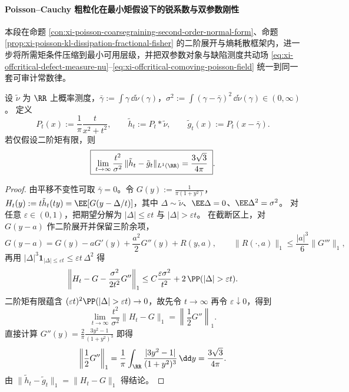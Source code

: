 \paragraph{Poisson--Cauchy 粗粒化在最小矩假设下的锐系数与双参数刚性}
本段在命题 \ref{con:xi-poisson-coarsegraining-second-order-normal-form}、命题 \ref{prop:xi-poisson-kl-dissipation-fractional-fisher} 的二阶展开与熵耗散框架内，进一步将所需矩条件压缩到最小可用层级，并把双参数对象与缺陷测度共动场
\eqref{eq:xi-offcritical-defect-measure-nu}--\eqref{eq:xi-offcritical-comoving-poisson-field}
统一到同一套可审计常数律。


\begin{theorem}\label{thm:xi-poisson-tv-sharp-constant-second-moment-only}
设 \(\tilde\nu\) 为 \(\RR\) 上概率测度，\(\bar\gamma:=\int \gamma\,\dd\tilde\nu(\gamma)\)，\(\sigma^2:=\int(\gamma-\bar\gamma)^2\,\dd\tilde\nu(\gamma)\in(0,\infty)\)。
定义
\[
P_t(x):=\frac{1}{\pi}\frac{t}{x^2+t^2},\qquad
\tilde h_t:=P_t*\tilde\nu,\qquad
\tilde g_t(x):=P_t(x-\bar\gamma).
\]
若仅假设二阶矩有限，则
\begin{equation}\label{eq:xi-poisson-tv-sharp-second-moment-only}
\boxed{\;
\lim_{t\to\infty}\frac{t^2}{\sigma^2}\,\|\tilde h_t-\tilde g_t\|_{L^1(\RR)}
=\frac{3\sqrt3}{4\pi}\; }.
\end{equation}
\end{theorem}

\begin{proof}
由平移不变性可取 \(\bar\gamma=0\)。令 \(G(y):=\frac{1}{\pi(1+y^2)}\)，\(H_t(y):=t\tilde h_t(ty)=\EE[G(y-\Delta/t)]\)，其中 \(\Delta\sim\tilde\nu\)、\(\EE\Delta=0\)、\(\EE\Delta^2=\sigma^2\)。
对任意 \(\varepsilon\in(0,1)\)，把期望分解为 \(|\Delta|\le \varepsilon t\) 与 \(|\Delta|>\varepsilon t\)。
在截断区上，对 \(G(y-a)\) 作二阶展开并保留三阶余项，
\[
G(y-a)=G(y)-aG'(y)+\frac{a^2}{2}G''(y)+R(y,a),\qquad
\|R(\cdot,a)\|_1\le \frac{|a|^3}{6}\|G'''\|_1,
\]
再用 \(|\Delta|^3\mathbf 1_{|\Delta|\le \varepsilon t}\le \varepsilon t\,\Delta^2\) 得
\[
\left\|H_t-G-\frac{\sigma^2}{2t^2}G''\right\|_1
\le C\frac{\varepsilon\sigma^2}{t^2}
+2\,\PP(|\Delta|>\varepsilon t).
\]
二阶矩有限蕴含 \((\varepsilon t)^2\PP(|\Delta|>\varepsilon t)\to0\)，故先令 \(t\to\infty\) 再令 \(\varepsilon\downarrow0\)，得到
\[
\lim_{t\to\infty}\frac{t^2}{\sigma^2}\|H_t-G\|_1=\left\|\frac12G''\right\|_1.
\]
直接计算 \(G''(y)=\frac{2}{\pi}\frac{3y^2-1}{(1+y^2)^3}\) 即得
\[
\left\|\frac12G''\right\|_1
=\frac{1}{\pi}\int_{\RR}\frac{|3y^2-1|}{(1+y^2)^3}\,\dd y
=\frac{3\sqrt3}{4\pi}.
\]
由 \(\|\tilde h_t-\tilde g_t\|_1=\|H_t-G\|_1\) 得结论。
\end{proof}

